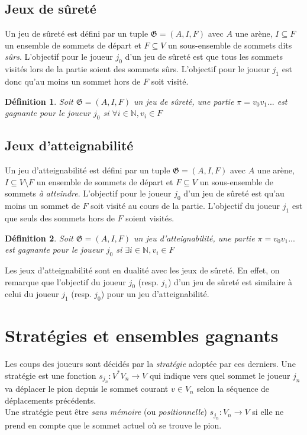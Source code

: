 \documentclass[12pt,a4paper,oneside,titlepage]{report}
\newtheorem{defi}{D\'efinition}[section]
\begin{document}
\subsection{Jeux de sûreté}
Un jeu de sûreté est défini par un tuple $\mathfrak{G}=(A,I,F)$ avec $A$ une arène, $I\subseteq F$ un ensemble de sommets de départ et $F\subseteq V$ un sous-ensemble de sommets dits \emph{sûrs}. L'objectif pour le joueur $j_0$ d'un jeu de sûreté est que tous les sommets visités lors de la partie soient des sommets sûrs. L'objectif pour le joueur $j_1$ est donc qu'au moins un sommet hors de $F$ soit visité.
\begin{defi}
Soit $\mathfrak{G}=(A,I,F)$ un jeu de sûreté, une partie $\pi=v_0v_1...$ est gagnante pour le joueur $j_0$ si $\forall i\in \mathbb{N}, v_i \in F$
\end{defi}
\subsection{Jeux d'atteignabilité}
Un jeu d'atteignabilité est défini par un tuple $\mathfrak{G}=(A,I,F)$ avec $A$ une arène, $I\subseteq V\setminus F$ un ensemble de sommets de départ et $F\subseteq V$ un sous-ensemble de sommets \emph{à atteindre}. L'objectif pour le joueur $j_0$ d'un jeu de sûreté est qu'au moins un sommet de $F$ soit visité au cours de la partie. L'objectif du joueur $j_1$ est que seuls des sommets hors de $F$ soient visités.
\begin{defi}
Soit $\mathfrak{G}=(A,I,F)$ un jeu d'atteignabilité, une partie $\pi=v_0v_1...$ est gagnante pour le joueur $j_0$ si $\exists i\in \mathbb{N}, v_i \in F$
\end{defi}
\noindent Les jeux d'atteignabilité sont en dualité avec les jeux de sûreté. En effet, on remarque que l'objectif du joueur $j_0$ (resp. $j_1$) d'un jeu de sûreté est similaire à celui du joueur $j_1$ (resp. $j_0$) pour un jeu d'atteignabilité.

\section{Stratégies et ensembles gagnants}
\noindent Les coups des joueurs sont décidés par la \emph{stratégie} adoptée par ces derniers. Une stratégie est une fonction $s_{j_n} : V^*V_n\to V$ qui indique vers quel sommet le joueur $j_n$ va déplacer le pion depuis le sommet courant $v\in V_n$ selon la séquence de déplacements précédents.\\
Une stratégie peut être \emph{sans mémoire} (ou \emph{positionnelle}) $s_{j_n} : V_n \to V$ si elle ne prend en compte que le sommet actuel où se trouve le pion.\\
\end{document}
